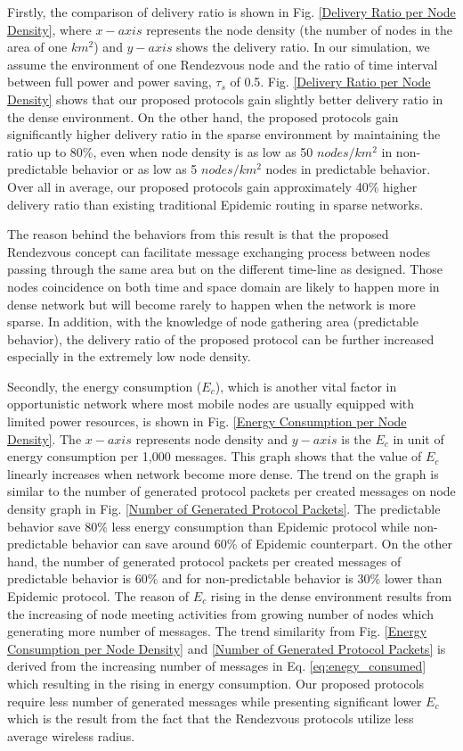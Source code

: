 \documentclass[conference]{IEEEtran}
\begin{document}
Firstly, the comparison of delivery ratio is shown in Fig. \ref{Delivery Ratio per Node Density}, where $x-axis$ represents the node density (the number of nodes in the area of one $km^2$) and $y-axis$ shows the delivery ratio.
In our simulation, we assume the environment of one Rendezvous node and the ratio of time interval between full power and power saving, $\tau_s$ of 0.5.
%
Fig. \ref{Delivery Ratio per Node Density} shows that our proposed protocols gain slightly better delivery ratio in the dense environment.
On the other hand, the proposed protocols gain significantly higher delivery ratio in the sparse environment by maintaining the ratio up to 80\%, even when node density is as low as 50 $nodes/km^2$ in non-predictable behavior or as low as 5 $nodes/km^2$ nodes in predictable behavior.
Over all in average, our proposed protocols gain approximately 40\% higher delivery ratio than existing traditional Epidemic routing in sparse networks.

The reason behind the behaviors from this result is that the proposed Rendezvous concept can facilitate message exchanging process between nodes passing through the same area but on the different time-line as designed.
Those nodes coincidence on both time and space domain are likely to happen more in dense network but will become rarely to happen when the network is more sparse.
In addition, with the knowledge of node gathering area (predictable behavior), the delivery ratio of the proposed protocol can be further increased especially in the extremely low node density. 

Secondly, the energy consumption ($E_c$), which is another vital factor in opportunistic network where most mobile nodes are usually equipped with limited power resources, is shown in Fig. \ref{Energy Consumption per Node Density}.
The $x-axis$ represents node density and $y-axis$ is the $E_c$ in unit of energy consumption per 1,000 messages.
This graph shows that the value of $E_c$ linearly increases when network become more dense.
The trend on the graph is similar to the number of generated protocol packets per created messages on node density graph in Fig. \ref{Number of Generated Protocol Packets}.
The predictable behavior save 80\% less energy consumption than Epidemic protocol while non-predictable behavior can save around 60\% of Epidemic counterpart.
On the other hand, the number of generated protocol packets per created messages of predictable behavior is 60\% and for non-predictable behavior is 30\% lower than Epidemic protocol.
The reason of $E_c$ rising in the dense environment results from the increasing of node meeting activities from growing number of nodes which generating more number of messages.
%
The trend similarity from Fig. \ref{Energy Consumption per Node Density} and \ref{Number of Generated Protocol Packets} is derived from the increasing number of messages in Eq. \ref{eq:enegy_consumed} which resulting in the rising in energy consumption. 
Our proposed protocols require less number of generated messages while presenting significant lower $E_c$ which is the result from the fact that the Rendezvous protocols utilize less average wireless radius.
\end{document}

